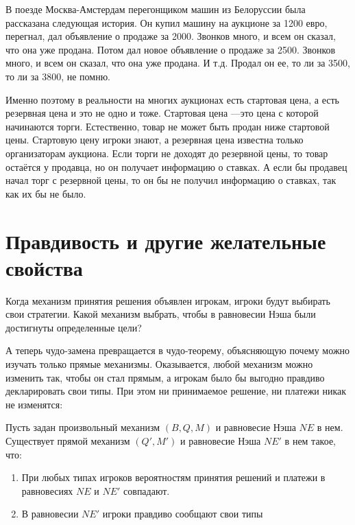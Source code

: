 В поезде Москва-Амстердам перегонщиком машин из Белоруссии была рассказана следующая история. Он купил машину на аукционе за 1200 евро, перегнал, дал объявление о продаже за 2000. Звонков много, и всем он сказал, что она уже продана. Потом дал новое  объявление о продаже за 2500. Звонков много, и всем он сказал, что она уже продана. И т.д. Продал он ее, то ли за 3500, то ли за 3800, не помню.

Именно поэтому в реальности на многих аукционах есть стартовая цена, а есть резервная цена и это не одно и тоже. Стартовая цена ---это цена с которой начинаются торги. Естественно, товар не может быть продан ниже стартовой цены. Стартовую цену игроки знают, а резервная цена известна только организаторам аукциона. Если торги не доходят до резервной цены, то товар остаётся у продавца, но он получает информацию о ставках. А если бы продавец начал торг с резервной цены, то он бы не получил информацию о ставках, так как их бы не было.


\section{Правдивость и другие желательные свойства}

Когда механизм принятия решения объявлен игрокам, игроки будут выбирать свои стратегии. Какой механизм выбрать, чтобы в равновесии Нэша были достигнуты определенные цели?

А теперь чудо-замена превращается в чудо-теорему, объясняющую почему можно изучать только прямые механизмы. Оказывается, любой механизм можно изменить так, чтобы он стал прямым, а игрокам было бы выгодно правдиво декларировать свои типы. При этом ни принимаемое решение, ни платежи никак не изменятся:

\begin{myth} \label{revelation_principle}
Пусть задан произвольный механизм $ (B, Q, M) $ и равновесие Нэша $NE$ в нем. Существует прямой механизм $ (Q', M') $ и равновесие Нэша $NE'$ в нем такое, что:
\begin{enumerate}
\item При любых типах игроков вероятностям принятия решений и платежи в равновесиях $ NE $ и $ NE' $ совпадают.
\item В равновесии $ NE' $ игроки правдиво сообщают свои типы
\end{enumerate}
\end{myth}

